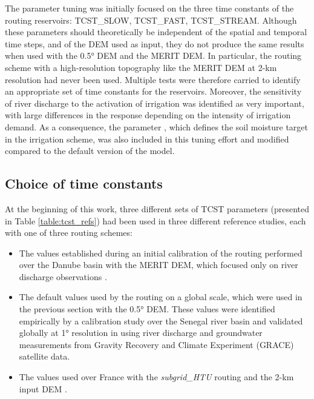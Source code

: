 The parameter tuning was initially focused on the three time constants of the routing reservoirs: TCST\_SLOW, TCST\_FAST, TCST\_STREAM. 
Although these parameters should theoretically be independent of the spatial and temporal time steps, and of the DEM used as input, they do not produce the same results when used with the 0.5° DEM and the MERIT DEM.
In particular, the \native routing scheme with a high-resolution topography like the MERIT DEM at 2-km resolution  had never been used.
Multiple tests were therefore carried to identify an appropriate set of time constants for the reservoirs.
Moreover, the sensitivity of river discharge to the activation of irrigation was identified as very important, with large differences in the response depending on the intensity of irrigation demand. As a consequence, the parameter \betairrig, which defines the soil moisture target in the irrigation scheme, was also included in this tuning effort and modified compared to the default version of the model.

\subsection{Choice of time constants}

At the beginning of this work, three different sets of TCST parameters (presented in Table \ref{table:tcst_refs}) had been used in three different reference studies, each with one of three routing schemes:
\begin{itemize}
\item The values established during an initial calibration of the \native routing performed over the Danube basin with the MERIT DEM, which focused only on river discharge observations \citep{kilic_evaluation_2023}.
\item The default values used by the \std routing on a global scale, which were used in the previous section with the 0.5° DEM. These values were identified empirically by a calibration study over the Senegal river basin and validated globally at 1° resolution in \citet{ngo-duc_53-year_2005, ngo-duc_validation_2007} using river discharge and groundwater measurements from Gravity Recovery and Climate Experiment (GRACE) satellite data.
\item The values used over France with the \textit{subgrid\_HTU} routing and the 2-km input DEM \citep{rinchiuso_improving_2022, huang_multi-objective_2024}.
\end{itemize}

